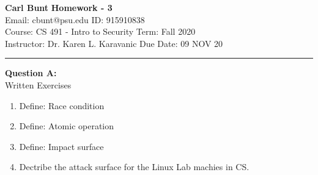\documentclass[a4paper, 11pt]{article}
\newenvironment{problem}[2][Question]
               { \begin{mdframed}[backgroundcolor=gray!20] \textbf{#1 #2:} \\}
               {   \end{mdframed}}
\begin{document}
 \noindent
 \large\textbf{Carl Bunt} \hfill \textbf{Homework - 3}   \\
 Email: cbunt@psu.edu \hfill ID: 915910838 \\
 \normalsize Course: CS 491 - Intro to Security \hfill Term: Fall 2020\\
 Instructor: Dr. Karen L. Karavanic \hfill Due Date: 09 NOV 20\\
 \noindent\rule{7in}{2.8pt}

 \begin{problem}{A}
   Written Exercises \\
   \begin{enumerate}[label=\arabic*.]
   \item
     Define: Race condition     
   \item
     Define: Atomic operation
   \item
     Define: Impact surface
   \item
     Dectribe the attack surface for the Linux Lab machies in CS.
   \end{enumerate}
 \end{problem}
\end{document}
